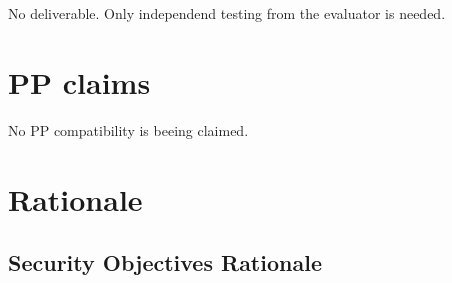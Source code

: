 \documentclass[12pt,english]{scrbook}
\begin{document}
No deliverable. Only independend testing from the evaluator is needed.





\chapter{PP claims}

No PP compatibility is beeing claimed.




\chapter{Rationale}






\section{Security Objectives Rationale}

\end{document}
